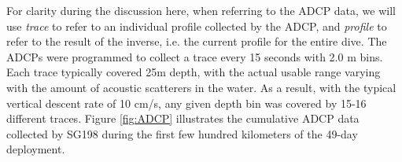 For clarity during the discussion here, when referring to the ADCP data, we will use \emph{trace} to refer to an individual profile collected by the ADCP, and \emph{profile} to refer to the result of the inverse, i.e. the current profile for the entire dive. The ADCPs were programmed to collect a trace every 15 seconds with 2.0 m bins. Each trace typically covered 25m depth, with the actual usable range varying with the amount of acoustic scatterers in the water. As a result, with the typical vertical descent rate of 10 cm/s, any
given depth bin was covered by 15-16 different traces.  Figure \ref{fig:ADCP} illustrates the cumulative ADCP data collected by SG198 during the first few hundred kilometers of the 49-day deployment.
 
